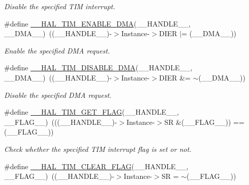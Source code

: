 \begin{DoxyCompactItemize}
\begin{DoxyCompactList}\small\item\em Disable the specified T\+IM interrupt. \end{DoxyCompactList}\item 
\#define \mbox{\hyperlink{group___t_i_m___exported___macros_gabb91ccd46cd7204c87170a1ea5b38135}{\+\_\+\+\_\+\+H\+A\+L\+\_\+\+T\+I\+M\+\_\+\+E\+N\+A\+B\+L\+E\+\_\+\+D\+MA}}(\+\_\+\+\_\+\+H\+A\+N\+D\+L\+E\+\_\+\+\_\+,  \+\_\+\+\_\+\+D\+M\+A\+\_\+\+\_\+)~((\+\_\+\+\_\+\+H\+A\+N\+D\+L\+E\+\_\+\+\_\+)-\/$>$Instance-\/$>$D\+I\+ER $\vert$= (\+\_\+\+\_\+\+D\+M\+A\+\_\+\+\_\+))
\begin{DoxyCompactList}\small\item\em Enable the specified D\+MA request. \end{DoxyCompactList}\item 
\#define \mbox{\hyperlink{group___t_i_m___exported___macros_ga1a6e8b19efd23fd0295802d904c4702f}{\+\_\+\+\_\+\+H\+A\+L\+\_\+\+T\+I\+M\+\_\+\+D\+I\+S\+A\+B\+L\+E\+\_\+\+D\+MA}}(\+\_\+\+\_\+\+H\+A\+N\+D\+L\+E\+\_\+\+\_\+,  \+\_\+\+\_\+\+D\+M\+A\+\_\+\+\_\+)~((\+\_\+\+\_\+\+H\+A\+N\+D\+L\+E\+\_\+\+\_\+)-\/$>$Instance-\/$>$D\+I\+ER \&= $\sim$(\+\_\+\+\_\+\+D\+M\+A\+\_\+\+\_\+))
\begin{DoxyCompactList}\small\item\em Disable the specified D\+MA request. \end{DoxyCompactList}\item 
\#define \mbox{\hyperlink{group___t_i_m___exported___macros_ga96d98c66ad9d85f00c148de99888ef19}{\+\_\+\+\_\+\+H\+A\+L\+\_\+\+T\+I\+M\+\_\+\+G\+E\+T\+\_\+\+F\+L\+AG}}(\+\_\+\+\_\+\+H\+A\+N\+D\+L\+E\+\_\+\+\_\+,  \+\_\+\+\_\+\+F\+L\+A\+G\+\_\+\+\_\+)~(((\+\_\+\+\_\+\+H\+A\+N\+D\+L\+E\+\_\+\+\_\+)-\/$>$Instance-\/$>$SR \&(\+\_\+\+\_\+\+F\+L\+A\+G\+\_\+\+\_\+)) == (\+\_\+\+\_\+\+F\+L\+A\+G\+\_\+\+\_\+))
\begin{DoxyCompactList}\small\item\em Check whether the specified T\+IM interrupt flag is set or not. \end{DoxyCompactList}\item 
\#define \mbox{\hyperlink{group___t_i_m___exported___macros_ga2fe74db6b8cb4badd04ed48e0f5ac7b4}{\+\_\+\+\_\+\+H\+A\+L\+\_\+\+T\+I\+M\+\_\+\+C\+L\+E\+A\+R\+\_\+\+F\+L\+AG}}(\+\_\+\+\_\+\+H\+A\+N\+D\+L\+E\+\_\+\+\_\+,  \+\_\+\+\_\+\+F\+L\+A\+G\+\_\+\+\_\+)~((\+\_\+\+\_\+\+H\+A\+N\+D\+L\+E\+\_\+\+\_\+)-\/$>$Instance-\/$>$SR = $\sim$(\+\_\+\+\_\+\+F\+L\+A\+G\+\_\+\+\_\+))

\end{DoxyCompactItemize}
